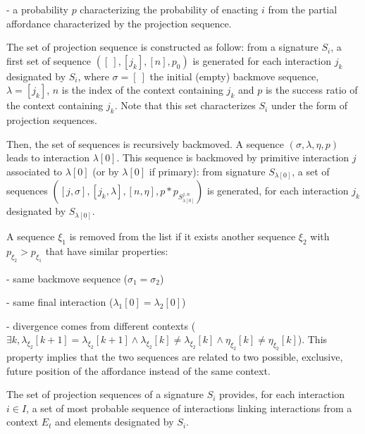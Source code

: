 \documentclass[conference]{IEEEtran}
\begin{document}
- a probability $p$ characterizing the probability of enacting $i$ from the partial affordance characterized by the projection sequence.


The set of projection sequence is constructed as follow: from a signature $S_i$, a first set of sequence $([\:], [j_k], [n], p_0)$ is generated for each interaction $j_k$ designated by $S_i$, where $\sigma=[\: ]$ the initial (empty) backmove sequence, $\lambda=[j_k]$, $n$ is the index of the context containing $j_k$ and $p$ is the success ratio of the context containing $j_k$. Note that this set characterizes $S_i$ under the form of projection sequences.

Then, the set of sequences is recursively backmoved. A sequence $(\sigma, \lambda, \eta, p)$ leads to interaction $\lambda[0]$. This sequence is backmoved by primitive interaction $j$ associated to $\lambda[0]$ (or by $\lambda[0]$ if primary): from signature $S_{\lambda[0]}$, a set of sequences $([j,\sigma], [j_k,\lambda], [n,\eta], p*p_{S_{\lambda[0]}^{j,n}})$ is generated, for each interaction $j_k$ designated by $S_{\lambda[0]}$.

A sequence $\xi_1$ is removed from the list if it exists another sequence $\xi_2$ with $p_{\xi_2}>p_{\xi_1}$ that have similar properties:

- same backmove sequence ($\sigma_1=\sigma_2$)

- same final interaction ($\lambda_1[0]=\lambda_2[0]$)

- divergence comes from different contexts ($\exists k, \lambda_{\xi_2}[k+1]=\lambda_{\xi_2}[k+1] \wedge \lambda_{\xi_2}[k] \neq \lambda_{\xi_2}[k] \wedge \eta_{\xi_2}[k] \neq\eta_{\xi_2}[k]$). This property implies that the two sequences are related to two possible, exclusive, future position of the affordance instead of the same context.

The set of projection sequences of a signature $S_i$ provides, for each interaction $i \in I$, a set of most probable sequence of interactions linking interactions from a context $E_t$ and elements designated by $S_i$.





\end{document}
